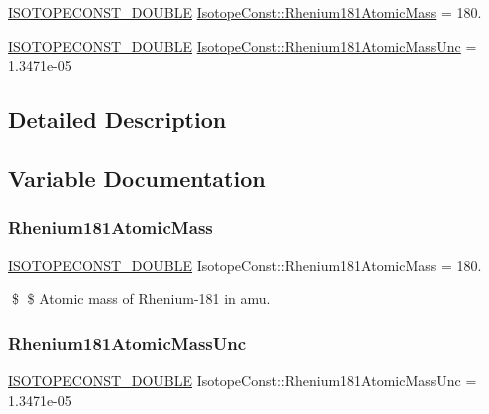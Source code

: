 \begin{DoxyCompactItemize}
\item 
\mbox{\hyperlink{group___isotope_const-_macros_ga8f45a7272ce02c0b4c65c44636ed719a}{I\+S\+O\+T\+O\+P\+E\+C\+O\+N\+S\+T\+\_\+\+D\+O\+U\+B\+LE}} \mbox{\hyperlink{group___isotope_const-_rhenium-_re181_gab672ea290abd531fe881cfb08595154b}{Isotope\+Const\+::\+Rhenium181\+Atomic\+Mass}} = 180.
\item 
\mbox{\hyperlink{group___isotope_const-_macros_ga8f45a7272ce02c0b4c65c44636ed719a}{I\+S\+O\+T\+O\+P\+E\+C\+O\+N\+S\+T\+\_\+\+D\+O\+U\+B\+LE}} \mbox{\hyperlink{group___isotope_const-_rhenium-_re181_gaace24fa3a45c844b8b8d8d23858ea5fe}{Isotope\+Const\+::\+Rhenium181\+Atomic\+Mass\+Unc}} = 1.\+3471e-\/05
\end{DoxyCompactItemize}


\subsection{Detailed Description}


\subsection{Variable Documentation}
\mbox{\label{group___isotope_const-_rhenium-_re181_gab672ea290abd531fe881cfb08595154b}} 
\subsubsection{\texorpdfstring{Rhenium181\+Atomic\+Mass}{Rhenium181AtomicMass}}
{\footnotesize\ttfamily \mbox{\hyperlink{group___isotope_const-_macros_ga8f45a7272ce02c0b4c65c44636ed719a}{I\+S\+O\+T\+O\+P\+E\+C\+O\+N\+S\+T\+\_\+\+D\+O\+U\+B\+LE}} Isotope\+Const\+::\+Rhenium181\+Atomic\+Mass = 180.}

\$ \$ Atomic mass of Rhenium-\/181 in amu. \mbox{\label{group___isotope_const-_rhenium-_re181_gaace24fa3a45c844b8b8d8d23858ea5fe}} 
\subsubsection{\texorpdfstring{Rhenium181\+Atomic\+Mass\+Unc}{Rhenium181AtomicMassUnc}}
{\footnotesize\ttfamily \mbox{\hyperlink{group___isotope_const-_macros_ga8f45a7272ce02c0b4c65c44636ed719a}{I\+S\+O\+T\+O\+P\+E\+C\+O\+N\+S\+T\+\_\+\+D\+O\+U\+B\+LE}} Isotope\+Const\+::\+Rhenium181\+Atomic\+Mass\+Unc = 1.\+3471e-\/05}

